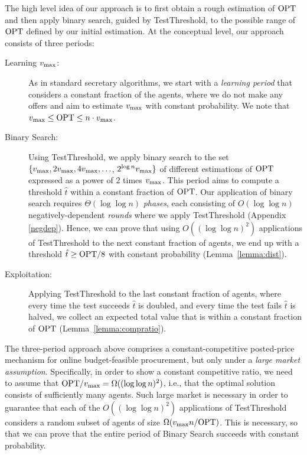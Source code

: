 The high level idea of our approach is to first obtain a rough estimation of $\mathrm{OPT}$ and then apply binary search, guided by TestThreshold, to the possible range of $\mathrm{OPT}$ defined by our initial estimation. At the conceptual level, our approach consists of three periods:
%
\begin{description}
\item[Learning $v_{\text{max}}$:] 
As in standard secretary algorithms, we start with a \emph{learning period} that considers a constant fraction of the agents, where we do not make any offers and aim to estimate $v_{\text{max}}$ with constant probability. We note that  $v_{\text{max}} \leq \mathrm{OPT} \leq n \cdot v_{\text{max}}$.

\item[Binary Search:] 
Using TestThreshold, we apply binary search to the set $\{ v_{\text{max}}, 2v_{\text{max}}, 4v_{\text{max}}, \ldots$, $2^{\log n} v_{\text{max}}\}$ of different estimations of $\mathrm{OPT}$ expressed as a power of $2$ times $v_{\text{max}}$. This period aims to compute a threshold $\hat{t}$ within a constant fraction of $\mathrm{OPT}$. Our application of binary search requires $\Theta(\log\log n)$ \emph{phases}, each consisting of $O(\log\log n)$ negatively-dependent \emph{rounds} where we apply TestThreshold (Appendix~
\ref{negdep}). Hence, we can prove that using $O((\log\log n)^2)$ applications of TestThreshold to the next constant fraction of agents, we end up with a threshold $\hat{t} \geq \mathrm{OPT}/8$ with constant probability (Lemma~\ref{lemma:dist}). 

\item[Exploitation:]
Applying TestThreshold to the last constant fraction of agents, where every time the test succeeds $\hat{t}$ is doubled, and every time the test fails $\hat{t}$ is halved, we collect an expected total value that is within a constant fraction of $\mathrm{OPT}$ (Lemma~\ref{lemma:compratio}). 
\end{description}

The three-period approach above comprises a constant-competitive posted-price mechanism for online budget-feasible procurement, but only under a \emph{large market assumption}. Specifically, in order to show a constant competitive ratio, we need to assume that $\mathrm{OPT} / v_{\text{max}} = \Omega((\log\log n)^2)$, i.e., that the optimal solution consists of sufficiently many agents.
%
Such large market is necessary in order to guarantee that each of the $O((\log\log n)^2)$ applications of TestThreshold considers a random subset of agents of size $\Omega( v_{\text{max}} n / \mathrm{OPT})$. This is necessary, so that we can prove that the entire period of Binary Search succeeds with constant probability. 

